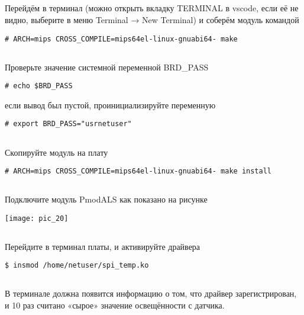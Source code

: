 \subsection{}Перейдём в терминал (можно открыть вкладку TERMINAL в vscode, если её не видно, выберите в меню Terminal → New Terminal) и соберём модуль командой
\begin{lstlisting}[style=bash]
# ARCH=mips CROSS_COMPILE=mips64el-linux-gnuabi64- make 
\end{lstlisting}

\subsection{}Проверьте значение системной переменной BRD\_PASS  
\begin{lstlisting}[style=bash]
# echo $BRD_PASS
\end{lstlisting}
если вывод был пустой, проинициализируйте переменную 
\begin{lstlisting}[style=bash]
# export BRD_PASS="usrnetuser" 
\end{lstlisting}

\subsection{}Скопируйте модуль на плату
\begin{lstlisting}[style=bash]
# ARCH=mips CROSS_COMPILE=mips64el-linux-gnuabi64- make install
\end{lstlisting}

\subsection{}Подключите модуль PmodALS как показано на рисунке 
\begin{center}
	\texttt{[image: pic\_20]}
\end{center}

\subsection{}Перейдите в терминал платы, и активируйте драйвера
\begin{lstlisting}[style=bash]
$ insmod /home/netuser/spi_temp.ko 
\end{lstlisting}

\subsection{}В терминале должна появится информацию о том, что драйвер зарегистрирован, и 10 раз считано «сырое» значение освещённости с датчика.

